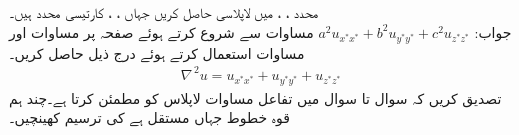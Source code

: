 
\quad
محدد ، ،  میں لاپلاسی حاصل کریں جہاں ، ،  کارتیسی محدد ہیں۔\\
جواب:\quad
$a^2u_{x^*x^*}+b^2u_{y^*y^*}+c^2u_{z^*z^*}$
\quad
مساوات  سے شروع کرتے ہوئے 
صفحہ  پر مساوات  اور مساوات  استعمال کرتے ہوئے درج ذیل حاصل کریں۔
\begin{align*}
\nabla^{\,2}u=u_{x^*x^*}+u_{y^*y^*}+u_{z^*z^*}
\end{align*}
تصدیق کریں کہ سوال  تا سوال  میں تفاعل   مساوات لاپلاس کو مطمئن کرتا ہے۔چند ہم قوہ خطوط  جہاں  مستقل ہے کی ترسیم کھینچیں۔

